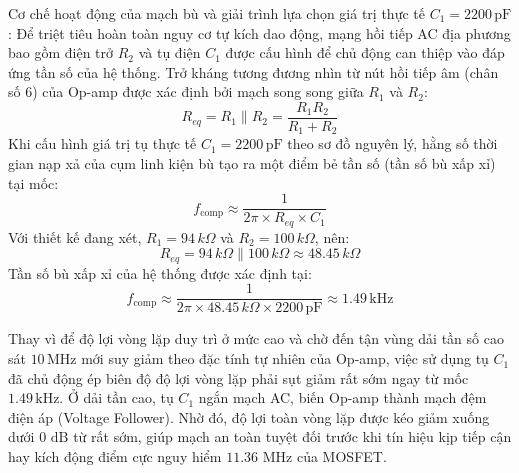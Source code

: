    Cơ chế hoạt động của mạch bù và giải trình lựa chọn giá trị thực tế $C_1 = 2200\,\mathrm{pF}$:
    Để triệt tiêu hoàn toàn nguy cơ tự kích dao động, mạng hồi tiếp AC địa phương bao gồm điện trở $R_2$ và tụ điện $C_1$ được cấu hình để chủ động can thiệp vào đáp ứng tần số của hệ thống. Trở kháng tương đương nhìn từ nút hồi tiếp âm (chân số 6) của Op-amp được xác định bởi mạch song song giữa $R_1$ và $R_2$:
    \begin{equation*}
    R_{eq} = R_1 \parallel R_2 = \frac{R_1 R_2}{R_1 + R_2}
    \end{equation*}
    Khi cấu hình giá trị tụ thực tế $C_1 = 2200\,\mathrm{pF}$ theo sơ đồ nguyên lý, hằng số thời gian nạp xả của cụm linh kiện bù tạo ra một điểm bẻ tần số (tần số bù xấp xỉ) tại mốc:
    \begin{equation*}
    f_{\mathrm{comp}} \approx \frac{1}{2\pi \times R_{eq} \times C_1}
    \end{equation*}
    Với thiết kế đang xét, $R_1=94\,k\Omega$ và $R_2=100\,k\Omega$, nên:
    \begin{equation*}
    R_{eq} = 94\,k\Omega \parallel 100\,k\Omega \approx 48.45\,k\Omega
    \end{equation*}
    Tần số bù xấp xỉ của hệ thống được xác định tại:
    \begin{equation*}
    f_{\mathrm{comp}} \approx \frac{1}{2\pi \times 48.45\,k\Omega \times 2200\,\mathrm{pF}} \approx 1.49\,\mathrm{kHz}
    \end{equation*}
      

Thay vì để độ lợi vòng lặp duy trì ở mức cao và chờ đến tận vùng dải tần số cao sát $10\,\mathrm{MHz}$ mới suy giảm theo đặc tính tự nhiên của Op-amp, việc sử dụng tụ $C_1$ đã chủ động ép biên độ độ lợi vòng lặp phải sụt giảm rất sớm ngay từ mốc $1.49\,\mathrm{kHz}$. Ở dải tần cao, tụ $C_1$ ngắn mạch AC, biến Op-amp thành mạch đệm điện áp (Voltage Follower). Nhờ đó, độ lợi toàn vòng lặp được kéo giảm xuống dưới $0\text{ dB}$ từ rất sớm, giúp mạch an toàn tuyệt đối trước khi tín hiệu kịp tiếp cận hay kích động điểm cực nguy hiểm $11.36\text{ MHz}$ của MOSFET.



